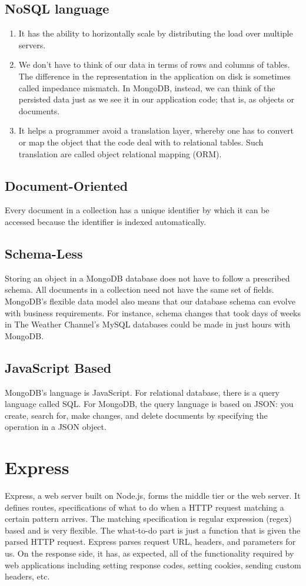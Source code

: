 \documentclass[12pt,a4paper]{report}
\begin{document}
\subsection{NoSQL language}\cite{parking_marketplace_srs}
\begin{enumerate}
	\renewcommand{\labelenumi}{{\textbf{\arabic{enumi}.}}}
	\item It has the ability to horizontally scale by distributing the load over multiple servers.  
	\item We don't have to think of our data in terms of rows and columns of tables. The difference in the representation in the application on disk is sometimes called impedance mismatch. In MongoDB, instead, we can think of the persisted data just as we see it in our application code; that is, as objects or documents.
	\item It helps a programmer avoid a translation layer, whereby one has to convert or map the object that the code deal with to relational tables. Such translation are called object relational mapping (ORM).  
\end{enumerate}
\subsection{Document-Oriented}
Every document in a collection has a unique identifier by which it can be accessed because the identifier is indexed automatically.
\subsection{Schema-Less}
Storing an object in a MongoDB database does not have to follow a prescribed schema. All documents in a collection need not have the same set of fields. MongoDB's flexible data model also means that our database schema can evolve with business requirements. For instance, schema changes that took days of weeks in The Weather Channel's MySQL databases could be made in just hours with MongoDB.  
\subsection{JavaScript Based}
MongoDB's language is JavaScript. For relational database, there is a query language called SQL. For MongoDB, the query language is based on JSON: you create, search for, make changes, and delete documents by specifying the operation in a JSON object. 
\section{Express}
Express, \cite{wiki:express} a web server built on Node.js, forms the middle tier or the web server. It defines routes, specifications of what to do when a HTTP request matching a certain pattern arrives. The matching specification is regular expression (regex) based and is very flexible. The what-to-do part is just a function that is given the parsed HTTP request. Express parses request URL, headers, and parameters for us. On the response side, it has, as expected, all of the functionality required by web applications including setting response codes, setting cookies, sending custom headers, etc.  
\end{document}
